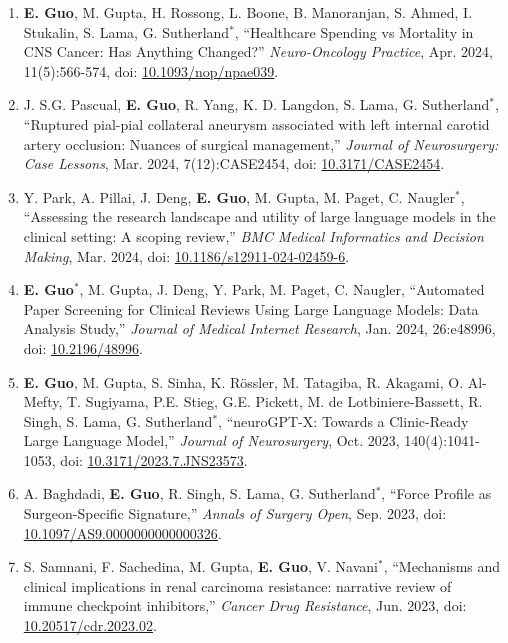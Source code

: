\documentclass{article}
\begin{document}
\begin{enumerate}
    \item \textbf{E. Guo}, M. Gupta, H. Rossong, L. Boone, B. Manoranjan, S. Ahmed, I. Stukalin, S. Lama, G. Sutherland$^*$, ``Healthcare Spending vs Mortality in CNS Cancer: Has Anything Changed?'' \textit{Neuro-Oncology Practice}, Apr. 2024, 11(5):566-574, doi: \href{https://doi.org/10.1093/nop/npae039}{10.1093/nop/npae039}.
    \item J. S.G. Pascual, \textbf{E. Guo}, R. Yang, K. D. Langdon, S. Lama, G. Sutherland$^*$, ``Ruptured pial-pial collateral aneurysm associated with left internal carotid artery occlusion: Nuances of surgical management,'' \textit{Journal of Neurosurgery: Case Lessons}, Mar. 2024, 7(12):CASE2454, doi: \href{https://doi.org/10.3171/CASE2454}{10.3171/CASE2454}.
    \item Y. Park, A. Pillai, J. Deng, \textbf{E. Guo}, M. Gupta, M. Paget, C. Naugler$^*$, ``Assessing the research landscape and utility of large language models in the clinical setting: A scoping review,'' \textit{BMC Medical Informatics and Decision Making}, Mar. 2024, doi: \href{https://doi.org/10.1186/s12911-024-02459-6}{10.1186/s12911-024-02459-6}.
    \item \textbf{E. Guo}$^*$, M. Gupta, J. Deng, Y. Park, M. Paget, C. Naugler, ``Automated Paper Screening for Clinical Reviews Using Large Language Models: Data Analysis Study,'' \textit{Journal of Medical Internet Research}, Jan. 2024, 26:e48996, doi: \href{https://doi.org/10.2196/48996}{10.2196/48996}.
    \item \textbf{E. Guo}, M. Gupta, S. Sinha, K. R\"ossler, M. Tatagiba, R. Akagami, O. Al-Mefty, T. Sugiyama, P.E. Stieg, G.E. Pickett, M. de Lotbiniere-Bassett, R. Singh, S. Lama, G. Sutherland$^*$, ``neuroGPT-X: Towards a Clinic-Ready Large Language Model,'' \textit{Journal of Neurosurgery}, Oct. 2023, 140(4):1041-1053, doi: \href{https://doi.org/10.3171/2023.7.JNS23573}{10.3171/2023.7.JNS23573}.
    \item A. Baghdadi, \textbf{E. Guo}, R. Singh, S. Lama, G. Sutherland$^*$, ``Force Profile as Surgeon-Specific Signature,'' \textit{Annals of Surgery Open}, Sep. 2023, doi: \href{https://doi.org/10.1097/AS9.0000000000000326}{10.1097/AS9.0000000000000326}.
    \item S. Samnani, F. Sachedina, M. Gupta, \textbf{E. Guo}, V. Navani$^*$, ``Mechanisms and clinical implications in renal carcinoma resistance: narrative review of immune checkpoint inhibitors,'' \textit{Cancer Drug Resistance}, Jun. 2023, doi: \href{https://doi.org/10.20517/cdr.2023.02 }{10.20517/cdr.2023.02}.

\end{enumerate}
\end{document}
